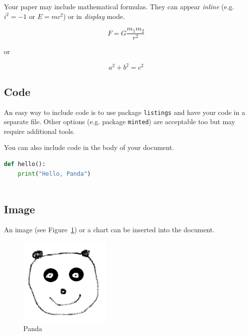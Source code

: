 \documentclass[11pt]{article}
\begin{document}
Your paper may include mathematical formulas. They can appear \emph{inline} (e.g. \begin{math}i^2=-1\end{math} or \(E=mc^2\)) or in \emph{display} mode.

\begin{equation}
    F = G \frac{m_1 m_2}{r^2}
\end{equation}

or

\[a^2 + b^2 = c^2\]

\subsection{Code}

An easy way to include code is to use package \texttt{listings} and have your code in a separate file. Other options (e.g. package \texttt{minted}) are acceptable too but may require additional tools.



\noindent You can also include code in the body of your document.

\begin{lstlisting}[language=Python, caption=\texttt{hello} inline and with different options, captionpos=b, frame=trbl, showstringspaces=false]
def hello():
    print("Hello, Panda")
    
\end{lstlisting}

\subsection{Image}

An image (see Figure~\ref{fig:panda1}) or a chart can be inserted into the document.

\begin{figure}[!htbp]
    \centering
    \includegraphics[width=0.4\textwidth]{panda.png}
    \caption{Panda}
    \label{fig:panda1}

\end{figure}
\end{document}
